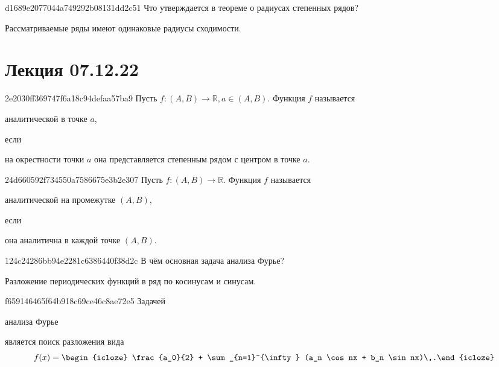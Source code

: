 \begin{note}{d1689e2077044a749292b08131dd2c51}
    Что утверждается в теореме о радиусах степенных рядов?

    \begin{cloze}{1}
        Рассматриваемые ряды имеют одинаковые радиусы сходимости.
    \end{cloze}
\end{note}

\section{Лекция 07.12.22}
\begin{note}{2e2030ff369747f6a18c94defaa57ba9}
    Пусть \({ f : (A, B) \to \mathbb R, a \in (A, B) }\).
    Функция \({ f }\) называется \begin{icloze}{2}аналитической в точке \({ a }\),\end{icloze} если \begin{icloze}{1}на окрестности точки \({ a }\) она представляется степенным рядом с центром в точке \({ a }\).\end{icloze}
\end{note}

\begin{note}{24d660592f734550a7586675e3b2e307}
    Пусть \({ f : (A, B) \to \mathbb R }\).
    Функция \({ f }\) называется \begin{icloze}{2}аналитической на промежутке \({ (A, B) }\),\end{icloze} если \begin{icloze}{1}она аналитична в каждой точке \({ (A, B) }\).\end{icloze}
\end{note}

\begin{note}{124c24286bb94e2281c6386440f38d2c}
    В чём основная задача анализа Фурье?

    \begin{cloze}{1}
        Разложение периодических функций в ряд по косинусам и синусам.
    \end{cloze}
\end{note}

\begin{note}{f659146465f64b918c69ce46c8ae72e5}
    Задачей \begin{icloze}{2}анализа Фурье\end{icloze} является поиск разложения вида
    \[
        f(x) = \begin{icloze}{1}\frac{a_0}{2} + \sum_{n=1}^{\infty} (a_n \cos nx + b_n \sin nx)\,.\end{icloze}
    \]
\end{note}

